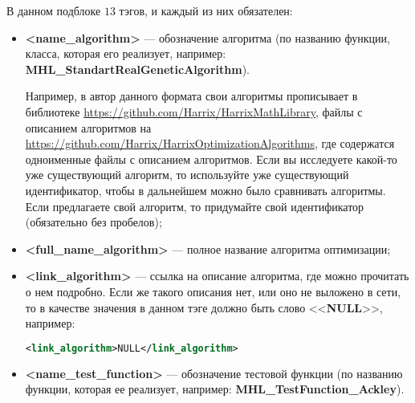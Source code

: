 \documentclass[a4paper,12pt]{article}
\begin{document}
В данном подблоке $ 13 $ тэгов, и каждый из них обязателен:
\begin{itemize}
\item \textbf{<name\_algorithm>} --- обозначение алгоритма (по названию функции, класса, которая его реализует, например: \textbf{MHL\_StandartRealGeneticAlgorithm}). 

Например, в автор данного формата свои алгоритмы прописывает в библиотеке \href {https://github.com/Harrix/HarrixMathLibrary} {https://github.com/Harrix/HarrixMathLibrary}, файлы с описанием алгоритмов на \href {https://github.com/Harrix/HarrixOptimizationAlgorithms} {https://github.com/Harrix/HarrixOptimizationAlgorithms}, где содержатся одноименные файлы с описанием алгоритмов. Если вы исследуете какой-то уже существующий алгоритм, то используйте уже существующий идентификатор, чтобы в дальнейшем можно было сравнивать алгоритмы. Если предлагаете свой алгоритм, то придумайте свой идентификатор (обязательно без пробелов);
\item \textbf{<full\_name\_algorithm>} --- полное название алгоритма оптимизации;
\item \textbf{<link\_algorithm>} --- ссылка на описание алгоритма, где можно прочитать о нем подробно. Если же такого описания нет, или оно не выложено в сети, то в качестве значения в данном тэге должно быть слово <<\textbf{NULL}>>, например:
\begin{lstlisting}[label=Part08, language=xml ,caption=У алгоритма нет ссылки в файле Harrix Optimization Testing]
<link_algorithm>NULL</link_algorithm>
\end{lstlisting}
\item \textbf{<name\_test\_function>} --- обозначение  тестовой функции (по названию функции, которая ее реализует, например: \textbf{MHL\_TestFunction\_Ackley}). 


\end{itemize}
\end{document}
